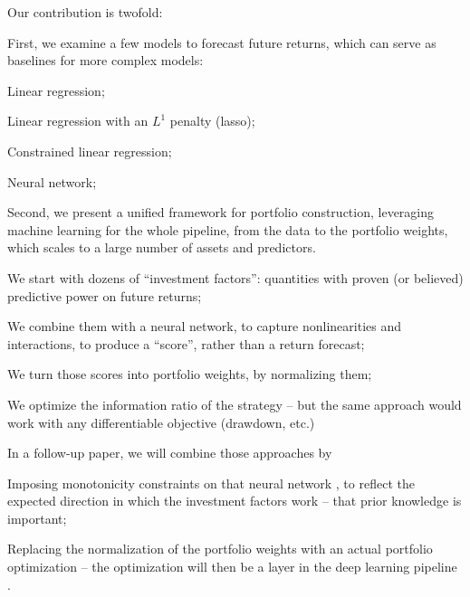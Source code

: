 \documentclass[12pt]{article}
\begin{document}
Our contribution is twofold: 
\begin{compactitem}[--]
\item First, we examine a few models to forecast future returns,
  which can serve as baselines for more complex models: 
  \begin{compactitem}[\ensuremath{\cdot}]
  \item Linear regression;
  \item Linear regression with an $L^1$ penalty (lasso);
  \item Constrained linear regression;
  \item Neural network;
  \end{compactitem}
\item Second, we present a unified framework for portfolio construction, leveraging machine learning for the whole pipeline,
from the data to the portfolio weights, which scales to a large number of assets and predictors.
  \begin{compactitem}[\ensuremath{\cdot}]
  \item We start with dozens of ``investment factors'': quantities with proven (or believed) predictive power on future returns;
  \item We combine them with a neural network, to capture nonlinearities and interactions, to produce a ``score'', rather than a return forecast; 
  \item We turn those scores into portfolio weights, by normalizing them;
  \item We optimize the information ratio of the strategy -- 
  but the same approach would work with any differentiable objective (drawdown, etc.)
  \end{compactitem}
\end{compactitem}

In a follow-up paper, we will combine those approaches by
\begin{compactitem}[--]
\item Imposing monotonicity constraints on that neural network
  \cite{liu_certified_2020,you_deep_2017}, 
  to reflect the expected direction in which the investment factors work -- 
  that prior knowledge is important;
\item Replacing the normalization of the portfolio weights 
  with an actual portfolio optimization -- 
  the optimization will then be a layer in the deep learning pipeline
  \cite{agrawal_differentiable_2019}.
\end{compactitem}
\end{document}
